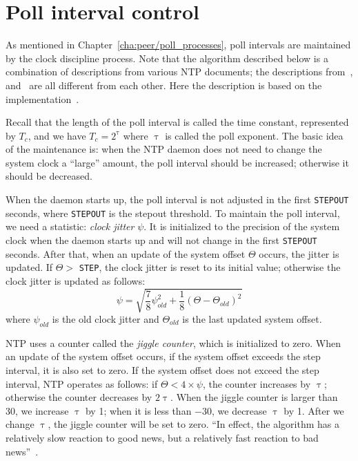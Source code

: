 \section{Poll interval control}%
\label{sec:poll_interval_control}
As mentioned in Chapter~\ref{cha:peer/poll_processes}, poll intervals are
maintained by the clock discipline process. Note that the algorithm described
below is a combination of descriptions from various NTP documents; the
descriptions from~\cite{redbook}, \cite{poll_process} and~\cite{rfc5905} are
all different from each other. Here the description is based on the
implementation~\cite{source_code}.

Recall that the length of the poll interval is called the time constant,
represented by $T_c$, and we have $T_c = 2^\uptau$ where $\uptau$ is called the
poll exponent. The basic idea of the maintenance is: when the NTP daemon does
not need to change the system clock a ``large'' amount, the poll interval
should be increased; otherwise it should be decreased.

When the daemon starts up, the poll interval is not adjusted in the first
\verb|STEPOUT| seconds, where \verb|STEPOUT| is the stepout threshold.
To maintain the poll interval, we need a statistic: \emph{clock jitter} $\psi$.
It is initialized to the precision of the system clock when the daemon starts
up and will not change in the first \verb|STEPOUT| seconds. After that, when
an update of the system offset $\Theta$ occurs, the jitter is updated. If
$\Theta > $ \verb|STEP|, the clock jitter is reset to its initial value;
otherwise the clock jitter is updated as follows:
\begin{equation}
    \psi = \sqrt{ \frac{7}{8}\psi_{old}^2 + \frac{1}{8}\left(\Theta -
    \Theta_{old}\right)^2 }
    \label{eq:clock_jitter}
\end{equation}
where $\psi_{old}$ is the old clock jitter and $\Theta_{old}$ is the last
updated system offset. 

NTP uses a counter called the \emph{jiggle counter}, which is initialized to
zero. When an update of the system offset occurs, if the system offset exceeds
the step interval, it is also set to zero. If the system offset does not exceed
the step interval, NTP operates as follows:
if $\Theta < 4 \times \psi$, the counter increases by $\uptau$; 
otherwise the counter decreases by $2\uptau$.
When the jiggle counter is larger than 30, we increase $\uptau$ by 1; when it
is less than $-30$, we decrease $\uptau$ by 1. After we change $\uptau$, the
jiggle counter will be set to zero. ``In effect, the algorithm has a relatively
slow reaction to good news, but a relatively fast reaction to bad
news''~\cite{poll_process}.



